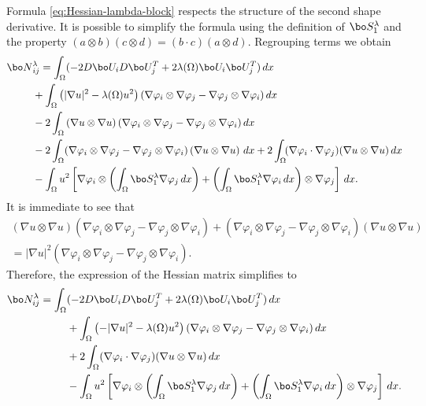 Formula \eqref{eq:Hessian-lambda-block} respects the structure of the second shape derivative. It is possible to simplify the formula using the definition of $\bo S_1^\lambda$ and the property $(a\otimes b)(c\otimes d) = (b\cdot c)(a\otimes d)$. Regrouping terms we obtain
\begin{align*}
\bo N&_{ij}^\lambda  = \int_\Omega (-2D \bo U_i D \bo U_j^T+ 2\lambda(\Omega) \bo U_i \bo U_j^T)\, dx \notag\\
& +\int_\Omega \left(|\nabla u|^2-\lambda(\Omega) u^2\right) (\nabla \varphi_i \otimes \nabla \varphi_j-\nabla \varphi_j \otimes \nabla \varphi_i) \, dx \notag \\
&-2\int_\Omega \left(\nabla u \otimes \nabla u\right) (\nabla \varphi_i \otimes \nabla \varphi_j-\nabla \varphi_j \otimes \nabla \varphi_i) \, dx \notag\\
&-2\int_\Omega (\nabla \varphi_i \otimes \nabla \varphi_j-\nabla \varphi_j \otimes \nabla \varphi_i)\left(\nabla u \otimes \nabla u\right) \, dx +2\int_\Omega\! (\nabla \varphi_i \cdot \nabla \varphi_j)(\nabla u \otimes \nabla u) \, dx \notag \\
& - \int_\Omega u^2\left[\nabla \varphi_i \otimes \left(\int_\Omega \bo S_1^\lambda \nabla \varphi_j \, dx\right)+
\left(\int_\Omega \bo S_1^\lambda \nabla \varphi_i \, dx\right)\otimes \nabla \varphi_j \right]\, dx.
\end{align*}
It is immediate to see that
\vspace*{-5pt}
\begin{multline*} \left(\nabla u \otimes \nabla u\right) (\nabla \varphi_i \otimes \nabla \varphi_j-\nabla \varphi_j \otimes \nabla \varphi_i)+ (\nabla \varphi_i \otimes \nabla \varphi_j-\nabla \varphi_j \otimes \nabla \varphi_i)\left(\nabla u \otimes \nabla u\right)\\
=|\nabla u|^2 (\nabla \varphi_i \otimes \nabla \varphi_j-\nabla \varphi_j \otimes \nabla \varphi_i).
\end{multline*}
Therefore, the expression of the Hessian matrix simplifies to
\begin{align}
\label{eq:Hessian-lambda-exp}
\bo N_{ij}^\lambda  = \int_\Omega& (-2D \bo U_i D \bo U_j^T+ 2\lambda(\Omega) \bo U_i \bo U_j^T)\, dx\\
& +\int_\Omega \left(-|\nabla u|^2-\lambda(\Omega) u^2\right) (\nabla \varphi_i \otimes \nabla \varphi_j-\nabla \varphi_j \otimes \nabla \varphi_i) \, dx \notag \\
& +2\int_\Omega (\nabla \varphi_i \cdot \nabla \varphi_j)(\nabla u \otimes \nabla u) \, dx \notag \\
& - \int_\Omega u^2\left[\nabla \varphi_i \otimes \left(\int_\Omega \bo S_1^\lambda \nabla \varphi_j\, dx \right)+
\left(\int_\Omega \bo S_1^\lambda \nabla \varphi_i\, dx \right)\otimes \nabla \varphi_j \right]\, dx. \notag
\end{align}

